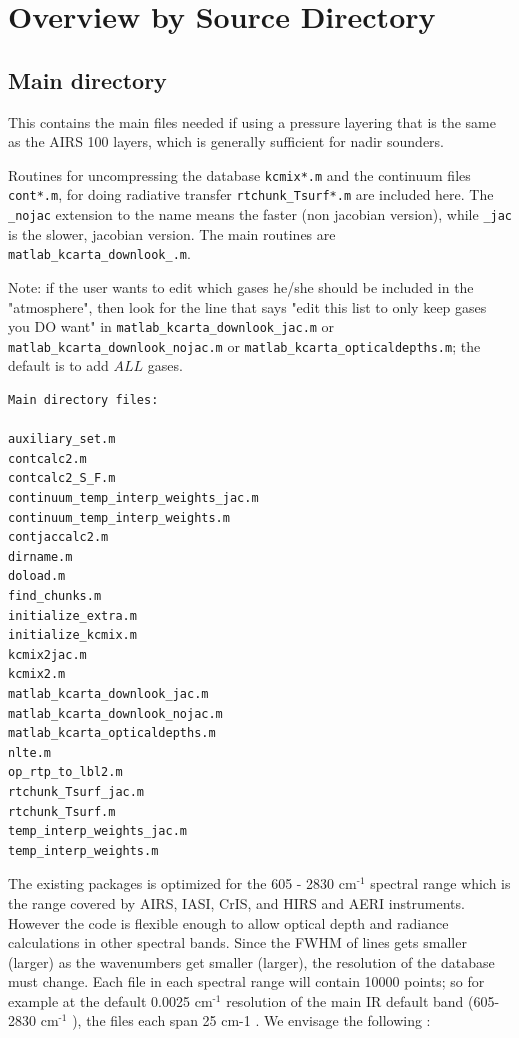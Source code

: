 \documentclass[11pt]{article}
\begin{document}
\section{Overview by Source Directory}
\label{sec-8}

\subsection{Main directory}
\label{sec-8-1}

This contains the main files needed if using a pressure layering that is
the same as the AIRS 100 layers, which is generally sufficient for nadir
sounders.

Routines for uncompressing the database \texttt{kcmix*.m} and the continuum
files \texttt{cont*.m}, for doing radiative transfer \texttt{rtchunk\_Tsurf*.m} are
included here. The \texttt{\_nojac} extension to the name means the faster (non
jacobian version), while \texttt{\_jac} is the slower, jacobian version. The
main routines are \texttt{matlab\_kcarta\_downlook\_.m}.

Note: if the user wants to edit which gases he/she should be included in
the "atmosphere", then look for the line that says "edit this list to
only keep gases you DO want" in \texttt{matlab\_kcarta\_downlook\_jac.m} or
\texttt{matlab\_kcarta\_downlook\_nojac.m} or \texttt{matlab\_kcarta\_opticaldepths.m}; the
default is to add $ALL$ gases.

\begin{verbatim}
Main directory files:

auxiliary_set.m
contcalc2.m
contcalc2_S_F.m
continuum_temp_interp_weights_jac.m
continuum_temp_interp_weights.m
contjaccalc2.m
dirname.m
doload.m
find_chunks.m
initialize_extra.m
initialize_kcmix.m
kcmix2jac.m
kcmix2.m
matlab_kcarta_downlook_jac.m
matlab_kcarta_downlook_nojac.m
matlab_kcarta_opticaldepths.m
nlte.m
op_rtp_to_lbl2.m
rtchunk_Tsurf_jac.m
rtchunk_Tsurf.m
temp_interp_weights_jac.m
temp_interp_weights.m
\end{verbatim}

The existing packages is optimized for the 605 - 2830 cm$^{\text{-1}}$ spectral
range which is the range covered by AIRS, IASI, CrIS, and HIRS and AERI
instruments. However the code is flexible enough to allow optical depth
and radiance calculations in other spectral bands. Since the FWHM of
lines gets smaller (larger) as the wavenumbers get smaller (larger), the
resolution of the database must change. Each file in each spectral range
will contain 10000 points; so for example at the default 0.0025 cm$^{\text{-1}}$
resolution of the main IR default band (605-2830 cm$^{\text{-1}}$ ), the files each
span 25 cm-1 . We envisage the following :
\end{document}

